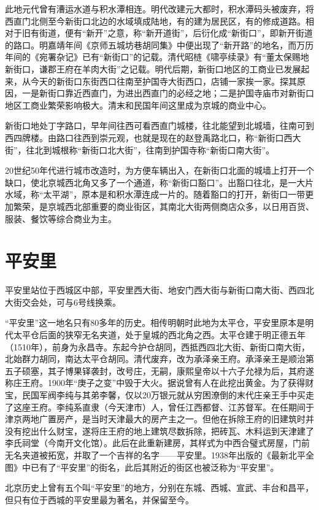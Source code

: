 此地元代曾有漕运水道与积水潭相连。明代改建元大都时，积水潭码头被废弃，将西直门北侧至今新街口北边的水域填成陆地，有的建为居民区，有的修成道路。相对于旧有街道，便有“新开”之意，称“新开道街”，后衍化成“新街口”，即新开街道的路口。明嘉靖年间《京师五城坊巷胡同集》中便出现了“新开路”的地名，而万历年间的《宛署杂记》已有“新街口”的记载。清代昭梿《啸亭续录》有“董太保赐地新街口，谦郡王府在羊肉大街”之记载。明代后期，新街口地区的工商业已发展起来，从今天的新街口东街西口往南至护国寺大街西口，店铺一家挨一家。探其原因，一是新街口靠近西直门，为进出西直门的必经之地；二是护国寺庙市对新街口地区工商业繁荣影响极大。清末和民国年间这里成为京城的商业中心。

新街口地处丁字路口，早年间往西可看西直门城楼，往北能望到北城墙，往南可到西四牌楼。由路口往西到崇元观，也就是现在的赵登禹路北口，称“新街口西大街”，往北到城根称“新街口北大街”，往南到护国寺称“新街口南大街”。

20世纪50年代进行城市改造时，为方便车辆出入，在新街口北面的城墙上打开一个缺口，使北京城西北角又多了一个通道，称“新街口豁口”。出豁口往北，是一大片水域，称“太平湖”，原本是和积水潭连成一片的。随着豁口的打开，新街口一带更加繁荣，是京城西北部重要的商业街区，其南北大街两侧商店众多，以日用百货、服装、餐饮等综合商业为主。

\section{平安里}
平安里站位于西城区中部，平安里西大街、地安门西大街与新街口南大街、西四北大街交会处，可与6号线换乘。

“平安里”这一地名只有80多年的历史。相传明朝时此地为太平仓，平安里原本是明代太平仓后面的狭窄无名夹道，处于皇城的西北角之西。太平仓建于明正德五年（1510年），前身为永昌寺。东起今护仓胡同，西抵西四北大街、新街口南大街，北始群力胡同，南达太平仓胡同。清代废弃，改为承泽亲王府。承泽亲王是顺治第五子硕塞，其子博果铎袭封，改号庄，无嗣，康熙皇帝以十六子允禄为后，其府遂称庄王府。1900年“庚子之变”中毁于大火。据说曾有人在此挖出黄金。为了获得财宝，民国军阀李纯与其弟李馨，仅以20万银元就从穷困潦倒的末代庄亲王手中买走了这座王府。李纯系直隶（今天津市）人，曾任江西都督、江苏督军。在任期间于津京两地广置房产，是当时天津最大的房产主之一。但他在拆除王府的旧建筑时并没有挖出什么财宝，遂将庄王府的地上建筑尽数拆除，把砖瓦、木料运到天津建了李氏祠堂（今南开文化馆）。此后在此重新建房，其样式为中西合璧式房屋，门前无名夹道被拓宽，并取了一个吉祥的名字——平安里。1938年出版的《最新北平全图》中已有了“平安里”的街名，此后其附近的街区也被泛称为“平安里”。

北京历史上曾有五个叫“平安里”的地方，分别在东城、西城、宣武、丰台和昌平，但只有位于西城的平安里最为著名，并保留至今。

